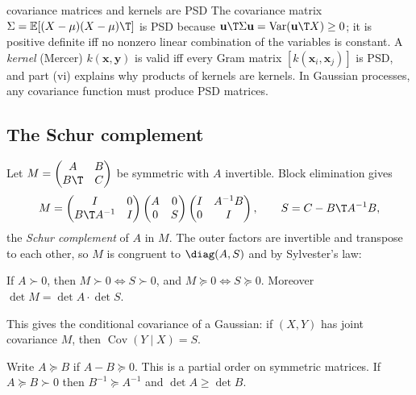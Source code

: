 \begin{interview}{covariance matrices and kernels are PSD}
The covariance matrix $\Sigma=\mathbb{E}[(X-\mu)(X-\mu)\T]$ is PSD because $\mathbf{u}\T\Sigma\mathbf{u}=\operatorname{Var}(\mathbf{u}\T X)\ge0$; it is positive definite iff no nonzero linear combination of the variables is constant. A \emph{kernel} (Mercer) $k(\mathbf{x},\mathbf{y})$ is valid iff every Gram matrix $[k(\mathbf{x}_i,\mathbf{x}_j)]$ is PSD, and part (vi) explains why products of kernels are kernels. In Gaussian processes, any covariance function must produce PSD matrices.
\end{interview}

\subsection*{The Schur complement}

Let $M=\begin{pmatrix}A&B\\B\T&C\end{pmatrix}$ be symmetric with $A$ invertible. Block elimination gives
\[ M=\begin{pmatrix}I&0\\B\T A^{-1}&I\end{pmatrix}\begin{pmatrix}A&0\\0&S\end{pmatrix}\begin{pmatrix}I&A^{-1}B\\0&I\end{pmatrix},\qquad S=C-B\T A^{-1}B, \]
the \emph{Schur complement} of $A$ in $M$. The outer factors are invertible and transpose to each other, so $M$ is congruent to $\diag(A,S)$ and by Sylvester's law:

\begin{theorem}\label{thm:schur}
If $A\succ0$, then $M\succ0\iff S\succ0$, and $M\succeq0\iff S\succeq0$. Moreover $\det M=\det A\cdot\det S$.
\end{theorem}

This gives the conditional covariance of a Gaussian: if $(X,Y)$ has joint covariance $M$, then $\operatorname{Cov}(Y\mid X)=S$.

\begin{theorem}\label{thm:loewner}
Write $A\succeq B$ if $A-B\succeq0$. This is a partial order on symmetric matrices. If $A\succeq B\succ0$ then $B^{-1}\succeq A^{-1}$ and $\det A\ge\det B$.
\end{theorem}

